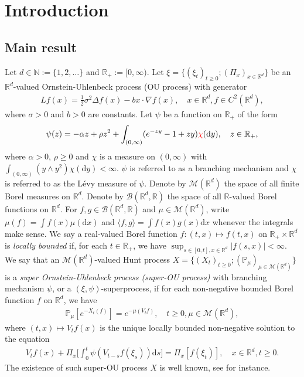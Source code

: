 \documentclass[12pt,a4paper]{amsart}
\theoremstyle{plain}
\theoremstyle{definition}
\numberwithin{equation}{section}
\begin{document}
\section{Introduction}
\subsection{Main result}
\label{subsec:M}
Let $d \in \mathbb N:= \{1,2,\dots\}$ and $\mathbb R_+:= [0,\infty)$.
Let $\xi=\{(\xi_t)_{t\geq 0}; (\Pi_x)_{x\in \mathbb R^d}\}$ be an $\mathbb R^d$-valued Ornstein-Uhlenbeck process (OU process) with generator
\begin{align}
  Lf(x)
  = \frac{1}{2}\sigma^2\Delta f(x)-b x \cdot \nabla f(x)
  , \quad  x\in \mathbb R^d, f \in C^2(\mathbb R^d),
\end{align}
where $\sigma > 0$ and $b > 0$ are constants.
Let $\psi$ be a function on $\mathbb R_+$ of the form
\begin{align}
  \label{eq: honogeneou branching mechanism}
  \psi(z)
  =- \alpha z + \rho z^2 + \int_{(0,\infty)} (e^{-zy} - 1 + zy) {\color{red} \chi}(\mathrm dy)
  , \quad  z \in \mathbb R_+,
\end{align}
where $\alpha > 0 $, $\rho \geq0$ and {\color{red}$\chi$} is a measure on $(0,\infty)$ with $\int_{(0,\infty)}(y\wedge y^2)\chi(\mathrm dy)< \infty$.
$\psi$ is referred to as a branching mechanism and {\color{red}$\chi$} is referred to as the L\'evy measure of $\psi$.
Denote by $\mathcal M(\mathbb R^d)$ the space of all finite Borel measures on $\mathbb R^d$.
Denote by $\mathcal B(\mathbb R^d, \mathbb R)$ the space of all $\mathbb R$-valued Borel functions on $\mathbb R^d$.
For $f,g\in \mathcal B(\mathbb R^d, \mathbb R)$ and $\mu \in \mathcal M(\mathbb R^d)$,
 write $\mu(f)= \int f(x)\mu(\mathrm dx)$
and $\langle f, g\rangle = \int f(x)g(x) \mathrm dx$ whenever the integrals make sense.
We say a real-valued Borel function $f:(t,x)\mapsto f(t,x)$ on $\mathbb R_+\times \mathbb R^d$ is \emph{locally bounded} if, for each $t\in \mathbb R_+$, we have $ \sup_{s\in [0,t],x\in \mathbb R^d} |f(s,x)|<\infty. $
We say that an $\mathcal M(\mathbb R^d)$-valued Hunt process $X = \{(X_t)_{t\geq 0}; (\mathbb{P}_{\mu})_{\mu \in \mathcal M(\mathbb R^d)}\}$
is a \emph{super Ornstein-Uhlenbeck process (super-OU process)} with branching mechanism $\psi$, or a $(\xi, \psi)$-superprocess, if for each non-negative bounded Borel function $f$ on $\mathbb R^d$, we have
\begin{align}
  \label{eq: def of V_t}
  \mathbb{P}_{\mu}[e^{-X_t(f)}]
  = e^{-\mu(V_tf)}
  , \quad t\geq 0, \mu \in \mathcal M(\mathbb R^d),
\end{align}
where $(t,x) \mapsto V_tf(x)$ is the unique locally bounded non-negative solution to the equation
\begin{align}
  V_tf(x) + \Pi_x \Big[ \int_0^t\psi (V_{t-s}f(\xi_s) ) \mathrm ds\Big]
	= \Pi_x [f(\xi_t)]
  , \quad x\in \mathbb R^d, t\geq 0.
\end{align}	
The existence of such super-OU process $X$ is well known, see \cite{Dynkin1993Superprocesses} for instance.
\end{document}
